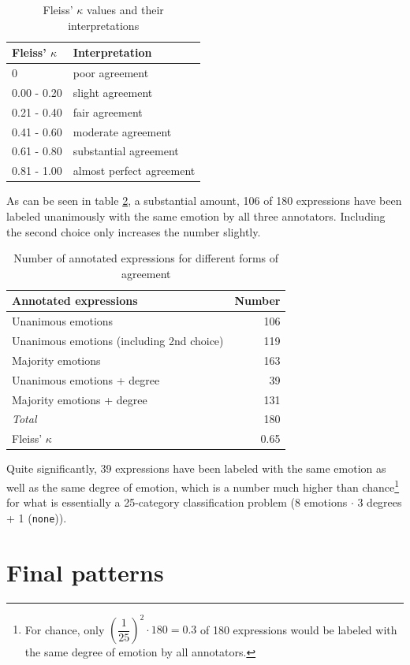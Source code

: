 \begin{table}[h]
\centering
\begin{tabular}{l|l}
Fleiss' $\kappa$ & Interpretation\\\hline
0              & poor agreement           \\
0.00 - 0.20    & slight agreement         \\
0.21 - 0.40    & fair agreement           \\
0.41 - 0.60    & moderate agreement       \\
0.61 - 0.80    & substantial agreement    \\
0.81 - 1.00    & almost perfect agreement
\end{tabular}
\caption{Fleiss' $\kappa$ values and their interpretations \cite{kappa}}
\label{tab:kappa_interpretation}
\end{table}

As can be seen in table \ref{tab:annotation}, a substantial amount, 106 of 180 expressions have been labeled unanimously with the same emotion by all three annotators. Including the second choice only increases the number slightly. 

\begin{table}
\centering
\begin{tabular}{l|r}
Annotated expressions & Number\\\hline
Unanimous emotions & 106\\
Unanimous emotions (including 2nd choice) & 119\\
Majority emotions & 163\\
Unanimous emotions + degree & 39\\
Majority emotions + degree & 131\\\hline
\textit{Total} & 180\\\hline
Fleiss' $\kappa$ & 0.65
\end{tabular}
\caption{Number of annotated expressions for different forms of agreement}
\label{tab:annotation}
\end{table}

Quite significantly, 39 expressions have been labeled with the same emotion as well as the same degree of emotion, which is a number much higher than chance\footnote{For chance, only $(\dfrac{1}{25})^{2} \cdot 180 = 0.3$ of 180 expressions would be labeled with the same degree of emotion by all annotators.} for what is essentially a 25-category classification problem (8 emotions $\cdot$ 3 degrees + 1 (\texttt{none})).

\section{Final patterns} \label{sec:final_patterns}

